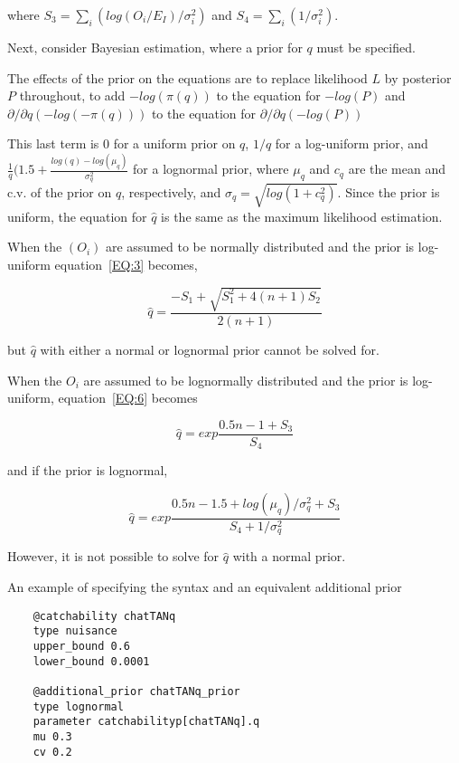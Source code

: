 where $S_3 = \sum_i (log(O_i /E_I)/\sigma_i^2)$ and $S_4 = \sum_i(1/\sigma_i^2)$.

Next, consider Bayesian estimation, where a prior for $q$ must be specified.

The effects of the prior on the equations are to replace likelihood $L$ by posterior $P$ throughout, to add $-log(\pi(q))$ to the equation for $-log(P)$ and $\partial/\partial q(-log(-\pi(q)))$ to the equation for $\partial/\partial q(-log(P))$

This last term is 0 for a uniform prior on $q$, $1/q$ for a log-uniform prior, and $\frac{1}{q}\bigg( 1.5 + \frac{log(q) - log(\mu_q)}{\sigma_q^2}$ for a lognormal prior, where $\mu_q$ and $c_q$ are the mean and c.v. of the prior on $q$, respectively, and $\sigma_q = \sqrt{log(1+c_q^2)}$. Since the prior is uniform, the equation for $\hat q$ is the same as the maximum likelihood estimation.

When the $(O_i)$ are assumed to be normally distributed and the prior is log-uniform equation~\eqref{EQ:3} becomes,

\begin{equation}\label{EQ:7}
\hat q = \frac{-S_1 + \sqrt{S_1^2 + 4(n + 1)S_2}}{2(n+1)}
\end{equation}

but $\hat q$ with either a normal or lognormal prior cannot be solved for.

When the $O_i$ are assumed to be lognormally distributed and the prior is log-uniform, equation~\eqref{EQ:6} becomes


\begin{equation}\label{EQ:8}
\hat q = exp\frac{0.5n -1 + S_3}{S_4}
\end{equation}

and if the prior is lognormal,

\begin{equation}\label{EQ:9}
\hat q = exp\frac{0.5n -1.5 + log(\mu_q)/\sigma_q^2 + S_3}{S_4 + 1 / \sigma_q^2}
\end{equation}

However, it is not possible to solve for $\hat q$ with a normal prior.

An example of specifying the syntax and an equivalent additional prior

{\small{\begin{verbatim}
	@catchability chatTANq
	type nuisance
	upper_bound 0.6
	lower_bound 0.0001

	@additional_prior chatTANq_prior
	type lognormal
	parameter catchabilityp[chatTANq].q
	mu 0.3
	cv 0.2
\end{verbatim}}}


